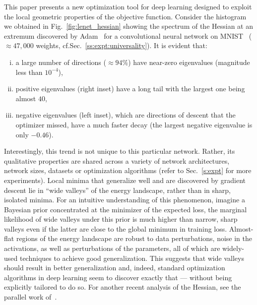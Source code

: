 \documentclass[10pt]{article}
\newcommand{\todo}[1]{{\color{gray}#1}\marginpar{\tiny\noindent{\raggedright{\color{blue}[TODO]}}}}
\renewcommand{\todo}[1]{#1}
\begin{document}
This paper presents a new optimization tool for deep learning designed to exploit the local geometric properties of the objective function. %
Consider the histogram we obtained in Fig.~\ref{fig:lenet_hessian} showing the spectrum of the Hessian at an extremum discovered by Adam~\citep{kingma2014adam} for a convolutional neural network on MNIST~\citep{lecun1998gradient} ($\approx 47,000$ weights, cf.\@ Sec.~\ref{ss:expt:universality}). It is evident that:
\begin{enumerate}[(i)]
\item a large number of directions ($\approx 94\%$) have near-zero eigenvalues (magnitude less than $10^{-4}$),
\item positive eigenvalues (right inset) have a long tail with the largest one being almost $40$,
\item negative eigenvalues (left inset), which are directions of descent that the optimizer missed, have a much faster decay (the largest negative eigenvalue is only $-0.46$).
\end{enumerate}
Interestingly, this trend is not unique to this particular network. Rather, its qualitative properties are shared across a variety of network architectures, network sizes, datasets or optimization algorithms (refer to Sec.~\ref{s:expt} for more experiments). Local minima that generalize well and are discovered by gradient descent lie in ``wide valleys'' of the energy landscape, rather than in sharp, isolated minima. For an intuitive understanding of this phenomenon, imagine a Bayesian prior concentrated at the minimizer of the expected loss, the marginal likelihood of wide valleys under this prior is much higher than narrow, sharp valleys even if the latter are close to the global minimum in training loss. Almost-flat regions of the energy landscape are robust to data perturbations, noise in the activations, as well as perturbations of the parameters, all of which are widely-used techniques to achieve good generalization. This suggests that wide valleys should result in better generalization and, indeed, standard optimization algorithms in deep learning seem to discover exactly that --- without being explicitly tailored to do so. For another recent analysis of the Hessian, see the parallel work of~\citet{sagun2016singularity}.
\end{document}
